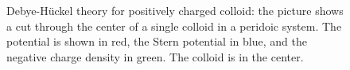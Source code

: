 \begin{figure}[htpb]
\caption{Debye-H\"uckel theory for positively charged colloid: the picture
shows a cut through the center of a single colloid in a peridoic system.
The potential is shown in red, the Stern potential in blue, and the negative 
charge density in green. The colloid is in the center.}
\label{fig7}
\end{figure}
\clearpage
